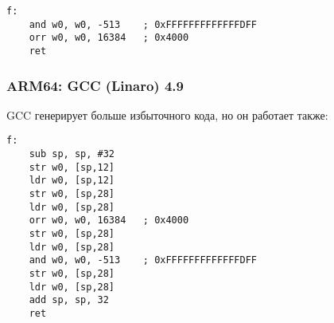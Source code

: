 \begin{lstlisting}[caption=\Optimizing GCC (Linaro) 4.9,style=customasmARM]
f:
	and	w0, w0, -513	; 0xFFFFFFFFFFFFFDFF
	orr	w0, w0, 16384	; 0x4000
	ret
\end{lstlisting}

\subsubsection{ARM64: \NonOptimizing GCC (Linaro) 4.9}

\NonOptimizing GCC генерирует больше избыточного кода, но он работает также:

\begin{lstlisting}[caption=\NonOptimizing GCC (Linaro) 4.9,style=customasmARM]
f:
	sub	sp, sp, #32
	str	w0, [sp,12]
	ldr	w0, [sp,12]
	str	w0, [sp,28]
	ldr	w0, [sp,28]
	orr	w0, w0, 16384	; 0x4000
	str	w0, [sp,28]
	ldr	w0, [sp,28]
	and	w0, w0, -513	; 0xFFFFFFFFFFFFFDFF
	str	w0, [sp,28]
	ldr	w0, [sp,28]
	add	sp, sp, 32
	ret
\end{lstlisting}

